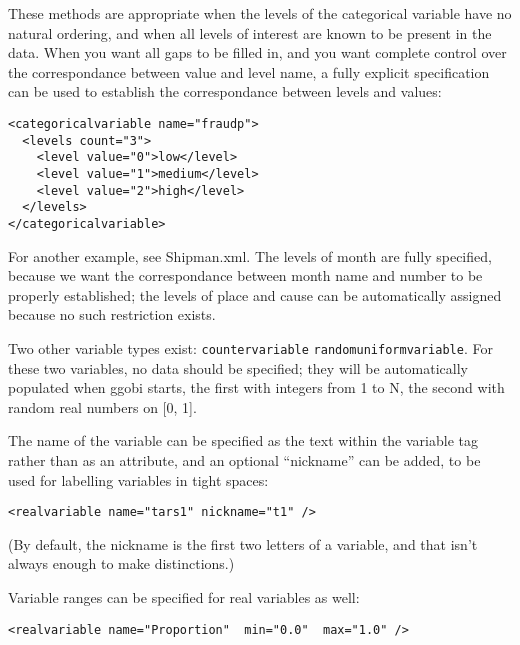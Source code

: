 \documentclass{article}
\begin{document}
These methods are appropriate when the levels of the categorical
variable have no natural ordering, and when all levels of interest are
known to be present in the data.  When you want all gaps to be filled
in, and you want complete control over the correspondance between
value and level name, a fully explicit specification can be used to
establish the correspondance between levels and values:
%
\begin{verbatim}
<categoricalvariable name="fraudp">
  <levels count="3">
    <level value="0">low</level>
    <level value="1">medium</level>
    <level value="2">high</level>
  </levels>
</categoricalvariable>
\end{verbatim}
%
For another example, see Shipman.xml.  The levels of month are
fully specified, because we want the correspondance between month
name and number to be properly established; the levels of place
and cause can be automatically assigned because no such restriction
exists.

Two other variable types exist: \texttt{countervariable}
\texttt{randomuniformvariable}.  For these two variables, no data
should be specified; they will be automatically populated when
ggobi starts, the first with integers from 1 to N, the second
with random real numbers on [0, 1].

The name of the variable can be specified as the text within the
variable tag rather than as an attribute, and an optional ``nickname''
can be added, to be used for labelling variables in tight spaces:
\begin{verbatim}
<realvariable name="tars1" nickname="t1" />
\end{verbatim}
%
(By default, the nickname is the first two letters of a variable,
and that isn't always enough to make distinctions.)

Variable ranges can be specified for real variables as well:

\begin{verbatim}
<realvariable name="Proportion"  min="0.0"  max="1.0" />
\end{verbatim}



\begin{comment}
Additionally, instructions as to how to create the variable can be
specified as a programming command via the Programming Instruction (PI)
\begin{verbatim}
<realvariable>
<?R rnorm(10)>
</realvariable>
\end{verbatim}
\end{comment}
\end{document}
